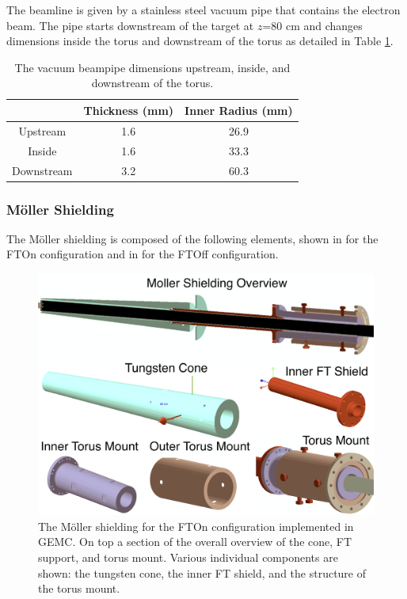 The beamline is given by a stainless steel vacuum pipe that contains the electron beam.
The pipe starts downstream of the target at $z$=80 cm and changes dimensions inside
the torus and downstream of the torus as detailed in Table \ref{tab:beampipe}.

\begin{table}[h]
	\begin{center}
		\begin{tabular}{| c | c | c |}
			\hline \hline
			                & Thickness (mm) & Inner Radius (mm)   \\
			\hline
              Upstream      &    1.6     &    26.9 \\
              Inside        &    1.6     &    33.3 \\
            Downstream      &    3.2     &    60.3 \\
			\hline \hline
		\end{tabular}
	\end{center}
	\caption{The vacuum beampipe dimensions upstream, inside, and downstream of the torus.}\label{tab:beampipe}
\end{table}


\subsubsection{M\"oller Shielding}
The M\"oller shielding is composed of the following elements, shown in  for the FTOn configuration
and in  for the FTOff configuration.

\begin{figure}
	\centering
	\includegraphics[width=0.99\columnwidth,keepaspectratio]{img/moellerShieldingFTOn.png}
	\caption{The M\"oller shielding for the FTOn configuration implemented in GEMC. On top a section of the overall overview of the cone, FT support, and torus mount.
		     Various individual components are shown: the tungsten cone, the inner FT shield, and the structure of the torus mount.}
	\label{fig:moellerShieldingFTOn}
\end{figure}

